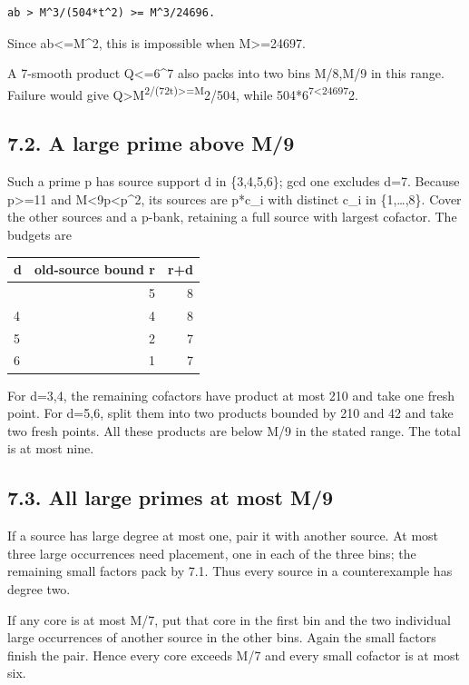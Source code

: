 \documentclass[11pt,a4paper]{article}
\begin{document}
\begin{verbatim}
ab > M^3/(504*t^2) >= M^3/24696.
\end{verbatim}

Since ab\textless=M\^{}2, this is impossible when M\textgreater=24697.

A 7-smooth product Q\textless=6\^{}7 also packs into two bins M/8,M/9 in
this range. Failure would give
Q\textgreater M\textsuperscript{2/(72t)\textgreater=M}2/504, while
504*6\textsuperscript{7\textless24697}2.

\subsection{7.2. A large prime above M/9}\label{a-large-prime-above-m9}

Such a prime p has source support d in \{3,4,5,6\}; gcd one excludes
d=7. Because p\textgreater=11 and M\textless9p\textless p\^{}2, its
sources are p*c\_i with distinct c\_i in \{1,\ldots,8\}. Cover the other
sources and a p-bank, retaining a full source with largest cofactor. The
budgets are

\begin{longtable}[]{@{}lrr@{}}
\toprule\noalign{}
d & old-source bound r & r+d \\
\midrule\noalign{}
\endhead
\bottomrule\noalign{}
\endlastfoot
3 & 5 & 8 \\
4 & 4 & 8 \\
5 & 2 & 7 \\
6 & 1 & 7 \\
\end{longtable}

For d=3,4, the remaining cofactors have product at most 210 and take one
fresh point. For d=5,6, split them into two products bounded by 210 and
42 and take two fresh points. All these products are below M/9 in the
stated range. The total is at most nine.

\subsection{7.3. All large primes at most
M/9}\label{all-large-primes-at-most-m9}

If a source has large degree at most one, pair it with another source.
At most three large occurrences need placement, one in each of the three
bins; the remaining small factors pack by 7.1. Thus every source in a
counterexample has degree two.

If any core is at most M/7, put that core in the first bin and the two
individual large occurrences of another source in the other bins. Again
the small factors finish the pair. Hence every core exceeds M/7 and
every small cofactor is at most six.
\end{document}
